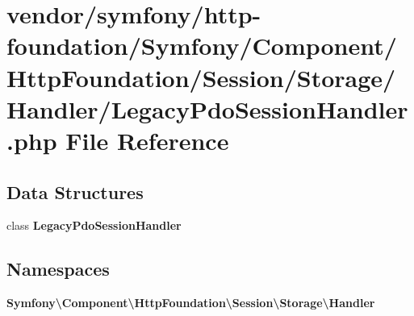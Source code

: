 \section{vendor/symfony/http-\/foundation/\+Symfony/\+Component/\+Http\+Foundation/\+Session/\+Storage/\+Handler/\+Legacy\+Pdo\+Session\+Handler.php File Reference}
\label{_legacy_pdo_session_handler_8php}
\subsection*{Data Structures}
\begin{DoxyCompactItemize}
\item 
class {\bf Legacy\+Pdo\+Session\+Handler}
\end{DoxyCompactItemize}
\subsection*{Namespaces}
\begin{DoxyCompactItemize}
\item 
 {\bf Symfony\textbackslash{}\+Component\textbackslash{}\+Http\+Foundation\textbackslash{}\+Session\textbackslash{}\+Storage\textbackslash{}\+Handler}
\end{DoxyCompactItemize}
